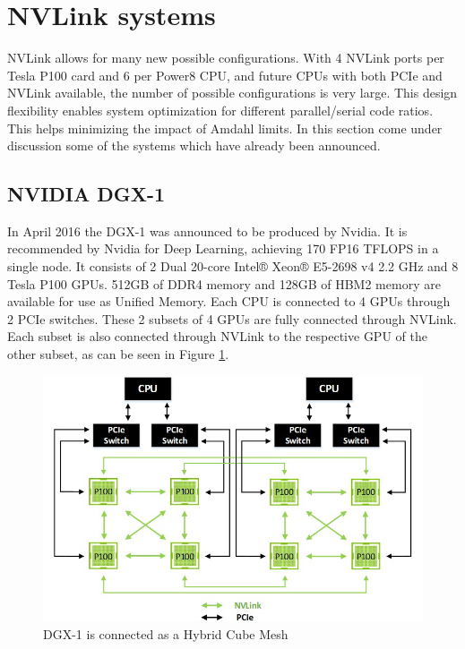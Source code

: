 
\section{NVLink systems}
NVLink allows for many new possible configurations.
With 4 NVLink ports per Tesla P100 card and 6 per Power8 CPU, and future CPUs with both PCIe and NVLink available, the number of possible configurations is very large.
This design flexibility enables system optimization for different parallel/serial code ratios.
This helps minimizing the impact of Amdahl limits.
In this section come under discussion some of the systems which have already been announced.

\subsection{NVIDIA DGX-1}
In April 2016 the DGX-1 was announced to be produced by Nvidia.
It is recommended by Nvidia for Deep Learning, achieving 170 FP16 TFLOPS in a single node.
It consists of 2 Dual 20-core Intel® Xeon® E5-2698 v4 2.2 GHz and 8 Tesla P100 GPUs.
512GB of DDR4 memory and 128GB of HBM2 memory are available for use as Unified Memory.
Each CPU is connected to 4 GPUs through 2 PCIe switches.
These 2 subsets of 4 GPUs are fully connected through NVLink.
Each subset is also connected through NVLink to the respective GPU of the other subset, as can be seen in Figure \ref{fig:hybrid-cube-mesh}.

\begin{figure}[ht!]
    \centering
    \includegraphics[width=\linewidth]{hybrid-cube-mesh}
    \caption{DGX-1 is connected as a Hybrid Cube Mesh \cite{nvidia:pascalwhitepaper}}
    \label{fig:hybrid-cube-mesh}
\end{figure}

